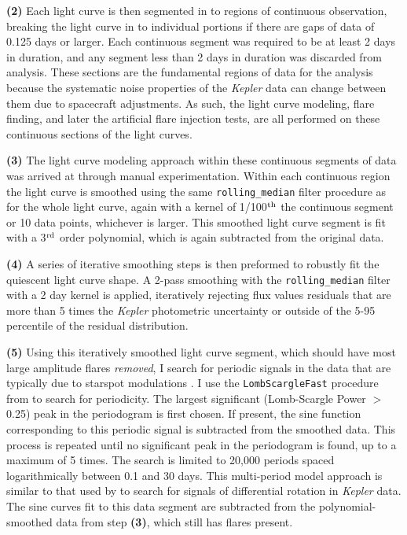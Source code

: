 \documentclass[twocolumn]{aastex6}
\newcommand{\Kepler}{\textsl{Kepler}\xspace}
\begin{document}
{\bf (2)} Each light curve is then segmented in to regions of continuous observation, breaking the light curve in to individual portions if there are gaps of data of 0.125 days or larger. Each continuous segment was required to be at least 2 days in duration, and any segment less than 2 days in duration was discarded from analysis. These sections are the fundamental regions of data for the analysis because the systematic noise properties of the \Kepler data can change between them due to spacecraft adjustments. As such, the light curve modeling, flare finding, and later the artificial flare injection tests, are all performed on these continuous sections of the light curves.

{\bf (3)} The light curve modeling approach within these continuous segments of data was arrived at through manual experimentation. Within each continuous region the light curve is smoothed using the same {\tt rolling\_median} filter procedure as for the whole light curve, again with a kernel of  1/100$^{\rm th}$ the continuous segment or 10 data points, whichever is larger. This smoothed light curve segment is fit with a 3$^{\rm rd}$ order polynomial, which is again subtracted from the original data.

{\bf (4)} A series of iterative smoothing steps is then preformed to robustly fit the quiescent light curve shape. A 2-pass smoothing with the {\tt rolling\_median} filter with a 2 day kernel is applied, iteratively rejecting flux values residuals that are more than 5 times the \Kepler photometric uncertainty or outside of the 5-95 percentile of the residual distribution.

{\bf (5)} Using this iteratively smoothed light curve segment, which should have most large amplitude flares {\it removed}, I search for periodic signals in the data that are typically due to starspot modulations \citep[e.g.][]{reinhold2013,davenport2015b}.  I use the {\tt LombScargleFast} procedure from \citet{gatspy} to search for periodicity. The largest significant (Lomb-Scargle Power $>$ 0.25) peak in the periodogram is first chosen. If present, the sine function corresponding to this periodic signal is subtracted from the smoothed data. This process is repeated until no significant peak in the periodogram is found, up to a maximum of 5 times.
The search is limited to 20,000 periods spaced logarithmically between 0.1 and 30 days. This multi-period model approach is similar to that used by \citet{reinhold2013a} to search for signals of differential rotation in \Kepler data. The sine curves fit to this data segment are subtracted from the polynomial-smoothed data from step {\bf (3)}, which still has flares present.
\end{document}
